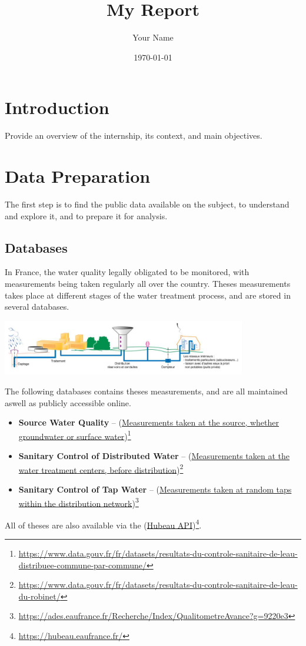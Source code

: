 \documentclass{article}
\title{My Report}
\author{Your Name}
\date{\today}
\begin{document}
\maketitle

\newpage
\tableofcontents
\newpage

\section{Introduction}
Provide an overview of the internship, its context, and main objectives.

\section{Data Preparation}
The first step is to find the public data available on the subject, to understand and explore it, and to prepare it for analysis.

\subsection{Databases}
In France, the water quality legally obligated to be monitored, with measurements being taken regularly all over the country.
Theses measurements takes place at different stages of the water treatment process, and are stored in several databases.

\includegraphics[width=0.8\textwidth]{Process_eau.png}

The following databases contains theses measurements, and are all maintained aswell as publicly accessible online.
\begin{itemize}
    \item \textbf{Source Water Quality} -- (\href{https://www.data.gouv.fr/fr/datasets/resultats-du-controle-sanitaire-de-leau-distribuee-commune-par-commune/}{Measurements taken at the source, whether groundwater or surface water})\footnote{\url{https://www.data.gouv.fr/fr/datasets/resultats-du-controle-sanitaire-de-leau-distribuee-commune-par-commune/}}
    \item \textbf{Sanitary Control of Distributed Water} -- (\href{https://www.data.gouv.fr/fr/datasets/resultats-du-controle-sanitaire-de-leau-du-robinet/}{Measurements taken at the water treatment centers, before distribution})\footnote{\url{https://www.data.gouv.fr/fr/datasets/resultats-du-controle-sanitaire-de-leau-du-robinet/}}
    \item \textbf{Sanitary Control of Tap Water} -- (\href{https://ades.eaufrance.fr/Recherche/Index/QualitometreAvance?g=9220e3}{Measurements taken at random taps within the distribution network})\footnote{\url{https://ades.eaufrance.fr/Recherche/Index/QualitometreAvance?g=9220e3}}
\end{itemize}
All of theses are also available via the (\href{https://hubeau.eaufrance.fr/}{Hubeau API})\footnote{\url{https://hubeau.eaufrance.fr/}}.
\end{document}
